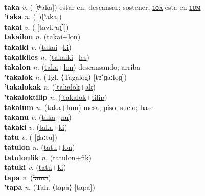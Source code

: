  \label{tafukuci} \\
\textbf{taka} \textit{v.} ( [t̪ʰaka])
estar en; descansar; sostener; \hyperref[takalon]{ʟᴏᴧ} esta en \hyperref[takalum]{ʟᴜᴍ} \label{taka} \\
\textbf{'taka} \textit{n.} ( [ɖʱaka])
 \label{'taka} \\
\textbf{takai} \textit{v.} ( [ta˧˩˧kʰaɪ̯˥])
 \label{takai} \\
\textbf{takailon} \textit{n.} (\hyperref[takai]{takai}+\hyperref[lon]{lon})
 \label{takailon} \\
\textbf{takaiki} \textit{v.} (\hyperref[takai]{takai}+\hyperref[ki]{ki})
 \label{takaiki} \\
\textbf{takaikiles} \textit{n.} (\hyperref[takaiki]{takaiki}+\hyperref[les]{les})
 \label{takaikiles} \\
\textbf{takalon} \textit{n.} (\hyperref[taka]{taka}+\hyperref[lon]{lon})
descansando; arriba \label{takalon} \\
\textbf{'takalok} \textit{n.} (Tgl. ⟨Tagalog⟩ [tɐˈɡaːloɡ])
 \label{'takalok} \\
\textbf{'takalokak} \textit{n.} (\hyperref['takalok]{'takalok}+\hyperref[ak]{ak})
 \label{'takalokak} \\
\textbf{'takaloktilip} \textit{n.} (\hyperref['takalok]{'takalok}+\hyperref[tilip]{tilip})
 \label{'takaloktilip} \\
\textbf{takalum} \textit{n.} (\hyperref[taka]{taka}+\hyperref[lum]{lum})
mesa; piso; suelo; base \label{takalum} \\
\textbf{takanu} \textit{v.} (\hyperref[taka]{taka}+\hyperref[nu]{nu})
 \label{takanu} \\
\textbf{takaki} \textit{v.} (\hyperref[taka]{taka}+\hyperref[ki]{ki})
 \label{takaki} \\
\textbf{tatu} \textit{v.} ( [d̤aːtu])
 \label{tatu} \\
\textbf{tatulon} \textit{n.} (\hyperref[tatu]{tatu}+\hyperref[lon]{lon})
 \label{tatulon} \\
\textbf{tatulonfik} \textit{n.} (\hyperref[tatulon]{tatulon}+\hyperref[fik]{fik})
 \label{tatulonfik} \\
\textbf{tatuki} \textit{v.} (\hyperref[tatu]{tatu}+\hyperref[ki]{ki})
 \label{tatuki} \\
\textbf{tapa} \textit{v.} (\hyperref[lama]{\sout{lama}})
 \label{tapa} \\
\textbf{'tapa} \textit{n.} (Tah. ⟨tapa⟩ [tapa])
 \label{'tapa} \\
